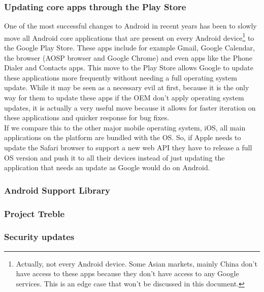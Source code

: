 \documentclass[11pt,a4paper]{report}
\begin{document}
\subsubsection{Updating core apps through the Play Store}
One of the most successful changes to Android in recent years has been to slowly move all Android core applications that are present on every Android device\footnote{Actually, not every Android device. Some Asian markets, mainly China don't have access to these apps because they don't have access to any Google services. This is an edge case that won't be discussed in this document. } to the Google Play Store. These apps include for example Gmail, Google Calendar, the browser (AOSP browser and Google Chrome) and even apps like the Phone Dialer and Contacts apps. This move to the Play Store allows Google to update these applications more frequently without needing a full operating system update. While it may be seen as a necessary evil at first, because it is the only way for them to update these apps if the OEM don't apply operating system updates, it is actually a very useful move because it allows for faster iteration on these applications and quicker response for bug fixes.\\

If we compare this to the other major mobile operating system, iOS, all main applications on the platform are bundled with the OS. So, if Apple needs to update the Safari browser to support a new web API they have to release a full OS version and push it to all their devices instead of just updating the application that needs an update as Google would do on Android.
\subsubsection{Android Support Library}
\subsubsection{Project Treble}
\subsubsection{Security updates}

\end{document}
